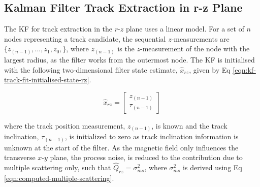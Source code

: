 \subsection{Kalman Filter Track Extraction in r-z Plane}
\label{chapter-6-end-of-derivation}

The KF for track extraction in the $r$-$z$ plane uses a linear model. For a set of $n$ nodes representing a track candidate, the sequential $z$-measurements are $\{z_{(n-1)}, ..., z_1, z_0, \}$, where $z_{(n-1)}$ is the $z$-measurement of the node with the largest radius, as the filter works from the outermost node. The KF is initialised with the following two-dimensional filter state estimate, $\hat{x}_{rz}$, given by Eq \eqref{eqn:kf-track-fit-initialised-state-rz}.

\begin{equation}
\hat{x}_{rz} = \begin{bmatrix} z_{(n-1)} \\ \tau_{(n-1)} \end{bmatrix} 
\label{eqn:kf-track-fit-initialised-state-rz}
\end{equation}


where the track position measurement, $z_{(n-1)}$, is known and the track inclination, $\tau_{(n-1)}$, is initialized to zero as track inclination information is unknown at the start of the filter. As the magnetic field only influences the transverse $x$-$y$ plane, the process noise, is reduced to the contribution due to multiple scattering only, such that $\hat{Q}_{rz} = \sigma_{ms}^{2}$, where $\sigma_{ms}^{2}$ is derived using Eq \eqref{eqn:computed-multiple-scattering}.






